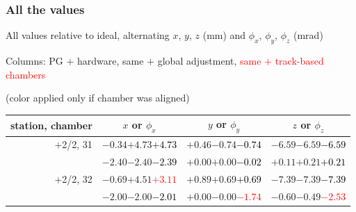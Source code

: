 \documentclass[compress]{beamer}
\begin{document}
\begin{frame}
\frametitle{All the values}
\tiny

All values relative to ideal, alternating $x$, $y$, $z$ (mm) and $\phi_x$, $\phi_y$, $\phi_z$ (mrad)

Columns: PG $+$ hardware, same $+$ global adjustment, \textcolor{red}{same $+$ track-based chambers}

\hfill (color applied only if chamber was aligned)

\vfill
\renewcommand{\arraystretch}{1.1}
\begin{tabular}{r | c | c | c}
station, chamber & $x$ or $\phi_x$ & $y$ or $\phi_y$ & $z$ or $\phi_z$ \\\hline
$+$2/2, 31 & $-0.34$\hspace{0.1 cm}$+4.73$\hspace{0.1 cm}\textcolor{black}{$+4.73$} & $+0.46$\hspace{0.1 cm}$-0.74$\hspace{0.1 cm}\textcolor{black}{$-0.74$} & $-6.59$\hspace{0.1 cm}$-6.59$\hspace{0.1 cm}\textcolor{black}{$-6.59$} \\
           & $-2.40$\hspace{0.1 cm}$-2.40$\hspace{0.1 cm}\textcolor{black}{$-2.39$} & $+0.00$\hspace{0.1 cm}$+0.00$\hspace{0.1 cm}\textcolor{black}{$-0.02$} & $+0.11$\hspace{0.1 cm}$+0.21$\hspace{0.1 cm}\textcolor{black}{$+0.21$} \\
$+$2/2, 32 & $-0.69$\hspace{0.1 cm}$+4.51$\hspace{0.1 cm}\textcolor{red}{$+3.11$} & $+0.89$\hspace{0.1 cm}$+0.69$\hspace{0.1 cm}\textcolor{black}{$+0.69$} & $-7.39$\hspace{0.1 cm}$-7.39$\hspace{0.1 cm}\textcolor{black}{$-7.39$} \\
           & $-2.00$\hspace{0.1 cm}$-2.00$\hspace{0.1 cm}\textcolor{black}{$-2.01$} & $+0.00$\hspace{0.1 cm}$-0.00$\hspace{0.1 cm}\textcolor{red}{$-1.74$} & $-0.60$\hspace{0.1 cm}$-0.49$\hspace{0.1 cm}\textcolor{red}{$-2.53$} \\

\end{tabular}
\end{frame}
\end{document}
